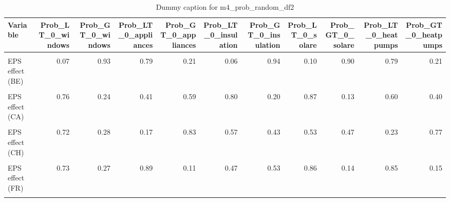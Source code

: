 \begin{table}
\centering
\caption{Dummy caption for m4_prob_random_df2}
\centering
\fontsize{10}{12}\selectfont
\begin{tabular}[t]{lrrrrrrrrrr}
\toprule
Variable & Prob\_LT\_0\_windows & Prob\_GT\_0\_windows & Prob\_LT\_0\_appliances & Prob\_GT\_0\_appliances & Prob\_LT\_0\_insulation & Prob\_GT\_0\_insulation & Prob\_LT\_0\_solare & Prob\_GT\_0\_solare & Prob\_LT\_0\_heatpumps & Prob\_GT\_0\_heatpumps\\
\midrule
\cellcolor{gray!10}{Intercept (BE)} & \cellcolor{gray!10}{0.29} & \cellcolor{gray!10}{0.71} & \cellcolor{gray!10}{0.59} & \cellcolor{gray!10}{0.41} & \cellcolor{gray!10}{0.30} & \cellcolor{gray!10}{0.70} & \cellcolor{gray!10}{0.36} & \cellcolor{gray!10}{0.64} & \cellcolor{gray!10}{0.62} & \cellcolor{gray!10}{0.38}\\
EPS effect (BE) & 0.07 & 0.93 & 0.79 & 0.21 & 0.06 & 0.94 & 0.10 & 0.90 & 0.79 & 0.21\\
\cellcolor{gray!10}{Intercept (CA)} & \cellcolor{gray!10}{0.61} & \cellcolor{gray!10}{0.39} & \cellcolor{gray!10}{0.48} & \cellcolor{gray!10}{0.52} & \cellcolor{gray!10}{0.61} & \cellcolor{gray!10}{0.39} & \cellcolor{gray!10}{0.64} & \cellcolor{gray!10}{0.36} & \cellcolor{gray!10}{0.53} & \cellcolor{gray!10}{0.47}\\
EPS effect (CA) & 0.76 & 0.24 & 0.41 & 0.59 & 0.80 & 0.20 & 0.87 & 0.13 & 0.60 & 0.40\\
\cellcolor{gray!10}{Intercept (CH)} & \cellcolor{gray!10}{0.55} & \cellcolor{gray!10}{0.45} & \cellcolor{gray!10}{0.42} & \cellcolor{gray!10}{0.58} & \cellcolor{gray!10}{0.52} & \cellcolor{gray!10}{0.48} & \cellcolor{gray!10}{0.50} & \cellcolor{gray!10}{0.50} & \cellcolor{gray!10}{0.42} & \cellcolor{gray!10}{0.58}\\
EPS effect (CH) & 0.72 & 0.28 & 0.17 & 0.83 & 0.57 & 0.43 & 0.53 & 0.47 & 0.23 & 0.77\\
\cellcolor{gray!10}{Intercept (FR)} & \cellcolor{gray!10}{0.56} & \cellcolor{gray!10}{0.44} & \cellcolor{gray!10}{0.60} & \cellcolor{gray!10}{0.40} & \cellcolor{gray!10}{0.49} & \cellcolor{gray!10}{0.51} & \cellcolor{gray!10}{0.59} & \cellcolor{gray!10}{0.41} & \cellcolor{gray!10}{0.61} & \cellcolor{gray!10}{0.39}\\
EPS effect (FR) & 0.73 & 0.27 & 0.89 & 0.11 & 0.47 & 0.53 & 0.86 & 0.14 & 0.85 & 0.15\\
\cellcolor{gray!10}{Intercept (IL)} & \cellcolor{gray!10}{0.55} & \cellcolor{gray!10}{0.45} & \cellcolor{gray!10}{0.51} & \cellcolor{gray!10}{0.49} & \cellcolor{gray!10}{0.54} & \cellcolor{gray!10}{0.46} & \cellcolor{gray!10}{0.55} & \cellcolor{gray!10}{0.45} & \cellcolor{gray!10}{0.54} & \cellcolor{gray!10}{0.46}\\

\end{tabular}
\end{table}
